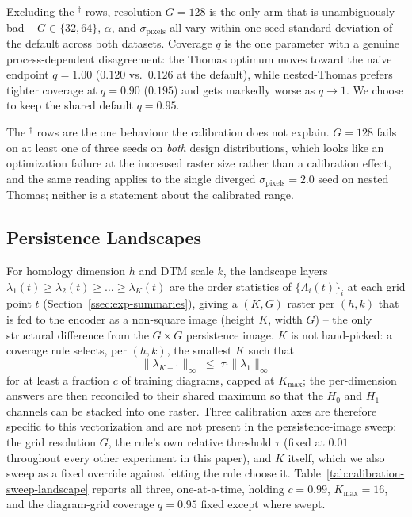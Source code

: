 \documentclass[11pt,letterpaper]{article}
\newcommand{\1}{\mathds{1}}
\theoremstyle{plain}
\theoremstyle{definitioncolon}
\begin{document}
Excluding the $^\dagger$ rows, resolution $G=128$ is the only arm that is
unambiguously bad -- $G\in\{32,64\}$, $\alpha$, and $\sigma_{\text{pixels}}$
all vary within one seed-standard-deviation of the default across both
datasets. Coverage $q$ is the one parameter with a genuine process-dependent
disagreement: the Thomas optimum moves toward the naive endpoint $q=1.00$
($0.120$ vs.\ $0.126$ at the default), while nested-Thomas prefers tighter
coverage at $q=0.90$ ($0.195$) and gets markedly worse as $q\to1$. We choose
to keep the shared default $q=0.95$.

The $^\dagger$ rows are the one behaviour the calibration does not explain.
$G=128$ fails on at least one of three seeds on \emph{both} design
distributions, which looks like an optimization failure at the increased raster
size rather than a calibration effect, and the same reading applies to the
single diverged $\sigma_{\text{pixels}}=2.0$ seed on nested Thomas; neither is a
statement about the calibrated range.

\subsection{Persistence Landscapes}
\label{app:calib-landscape}

For homology dimension $h$ and DTM scale $k$, the landscape layers
$\lambda_1(t) \geq \lambda_2(t) \geq \dots \geq \lambda_K(t)$ are the order
statistics of $\{\Lambda_i(t)\}_i$ at each grid point $t$ (Section~\ref{ssec:exp-summaries}),
giving a $(K, G)$ raster per $(h, k)$ that is fed to the encoder as a
non-square image (height $K$, width $G$) -- the only structural difference from
the $G \times G$ persistence image. $K$ is not hand-picked: a coverage rule
selects, per $(h,k)$, the smallest $K$ such that
    \[
    \|\lambda_{K+1}\|_\infty \;\leq\; \tau \cdot \|\lambda_1\|_\infty
    \]
for at least a fraction $c$ of training diagrams, capped at $K_{\max}$; the
per-dimension answers are then reconciled to their shared maximum so that the
$H_0$ and $H_1$ channels can be stacked into one raster. Three calibration axes
are therefore specific to this vectorization and are not present in the
persistence-image sweep: the grid resolution $G$, the rule's own relative
threshold $\tau$ (fixed at $0.01$ throughout every other experiment in this
paper), and $K$ itself, which we also sweep as a fixed override against letting
the rule choose it. Table~\ref{tab:calibration-sweep-landscape} reports all
three, one-at-a-time, holding $c = 0.99$, $K_{\max} = 16$, and the diagram-grid
coverage $q = 0.95$ fixed except where swept.
\end{document}
